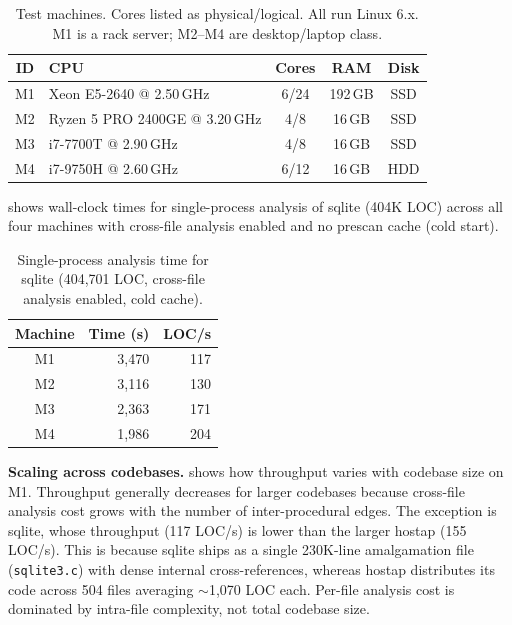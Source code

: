 \begin{table}[t]
\centering
\footnotesize
\begin{tabular}{@{}clccc@{}}
\toprule
\textbf{ID} & \textbf{CPU} & \textbf{Cores} & \textbf{RAM} & \textbf{Disk} \\
\midrule
M1 & Xeon E5-2640 @ 2.50\,GHz & 6/24 & 192\,GB & SSD \\
M2 & Ryzen 5 PRO 2400GE @ 3.20\,GHz & 4/8  & 16\,GB  & SSD \\
M3 & i7-7700T @ 2.90\,GHz    & 4/8  & 16\,GB  & SSD \\
M4 & i7-9750H @ 2.60\,GHz    & 6/12 & 16\,GB  & HDD \\
\bottomrule
\end{tabular}
\caption{Test machines.  Cores listed as physical/logical.
All run Linux 6.x.  M1 is a rack server; M2--M4 are desktop/laptop
class.}
\label{tab:testbed}
\end{table}

 shows wall-clock times for single-process analysis
of sqlite (404K LOC) across all four machines with cross-file analysis
enabled and no prescan cache (cold start).

\begin{table}[t]
\centering
\footnotesize
\begin{tabular}{@{}crr@{}}
\toprule
\textbf{Machine} & \textbf{Time (s)} & \textbf{LOC/s} \\
\midrule
M1 & 3{,}470 & 117 \\
M2 & 3{,}116 & 130 \\
M3 & 2{,}363 & 171 \\
M4 & 1{,}986 & 204 \\
\bottomrule
\end{tabular}
\caption{Single-process analysis time for sqlite (404,701 LOC,
cross-file analysis enabled, cold cache).}
\label{tab:runtime}
\end{table}

\textbf{Scaling across codebases.}
 shows how throughput varies with codebase
size on M1.  Throughput generally decreases for larger codebases
because cross-file analysis cost grows with the number of
inter-procedural edges.  The exception is sqlite, whose throughput
(117 LOC/s) is lower than the larger hostap (155 LOC/s).  This is
because sqlite ships as a single 230K-line amalgamation file
(\texttt{sqlite3.c}) with dense internal cross-references, whereas
hostap distributes its code across 504 files averaging $\sim$1{,}070
LOC each.  Per-file analysis cost is dominated by intra-file
complexity, not total codebase size.


